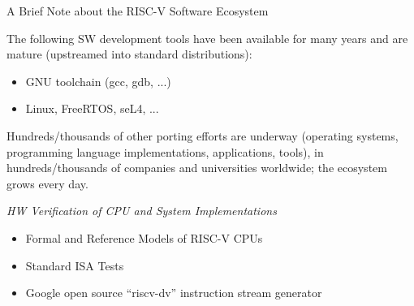 \documentclass{article}
\begin{document}
\begin{center}
  {\Huge
    A Brief Note about the RISC-V Software Ecosystem}

  \vspace*{1in}

  \begin{minipage}{9in}\LARGE
    The following SW development tools have been available for many
    years and are mature (upstreamed into standard distributions):

    \begin{itemize}
    \item GNU toolchain (gcc, gdb, ...)
    \item Linux, FreeRTOS, seL4, ...
    \end{itemize}

    \vspace{1in}

    Hundreds/thousands of other porting efforts are underway
    (operating systems, programming language implementations,
    applications, tools), in hundreds/thousands of companies and
    universities worldwide; the ecosystem grows every day.

  \end{minipage}

\end{center}

\clearpage


\begin{center}\Huge
  \vspace*{2in}

  \emph{HW Verification of CPU and System Implementations}

  \vspace*{1in}
  
  \begin{minipage}{7in}\LARGE
    \begin{itemize}
    \item Formal and Reference Models of RISC-V CPUs
    \item Standard ISA Tests
    \item Google open source ``riscv-dv'' instruction stream generator
    \end{itemize}
  \end{minipage}

\end{center}

\clearpage
\end{document}

